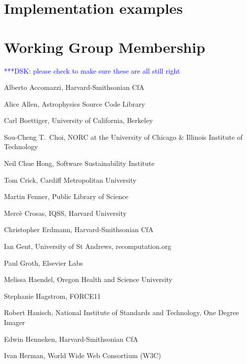\documentclass[11pt, oneside]{amsart}
\newcommand{\katznote}[1]{ {\textcolor{blue} { ***DSK: #1 }}} %
\newcommand{\dmnote}[1]{ {\textcolor{purple} { ***DM: #1 }}} %
\newcommand{\LJHnote}[1]{ {\textcolor{fuschsia} { ***LJH: #1 }}} %
\begin{document}

\section{Implementation examples}
\label{sec:examples}




\appendix

\section{Working Group Membership}
\label{app:wg_members}

\katznote{please check to make sure these are all still right}

Alberto Accomazzi, Harvard-Smithsonian CfA

Alice Allen, Astrophysics Source Code Library

Carl Boettiger, University of California,  Berkeley

Sou-Cheng T.~Choi, NORC at the University of Chicago \& Illinois Institute of Technology

Neil Chue Hong, Software Sustainability Institute

Tom Crick, Cardiff Metropolitan University

Martin Fenner, Public Library of Science

Merc\`e Crosas, IQSS, Harvard University

Christopher Erdmann, Harvard-Smithsonian CfA

Ian Gent, University of St Andrews, recomputation.org

Paul Groth, Elsevier Labs

Melissa Haendel, Oregon Health and Science University

Stephanie Hagstrom, FORCE11

Robert Hanisch, National Institute of Standards and Technology, One Degree Imager

Edwin Henneken, Harvard-Smithsonian CfA

Ivan Herman, World Wide Web Consortium (W3C)
\end{document}
